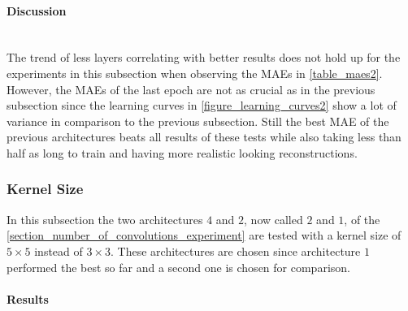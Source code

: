 \paragraph{Discussion} \mbox{} \\

The trend of less layers correlating with better results does not hold up for the experiments in this subsection when
observing the MAEs in \autoref{table_maes2}. However, the MAEs of the last epoch are not as crucial as in the 
previous subsection since the learning curves in \autoref{figure_learning_curves2} show a lot of variance in 
comparison to the previous subsection. Still the best MAE of the previous architectures beats all results of 
these tests while also taking less than half as long to train and having more realistic looking reconstructions.


\pagebreak
\subsubsection{Kernel Size}

In this subsection the two architectures $4$ and $2$, now called $2$ and $1$,
of the \autoref{section_number_of_convolutions_experiment}
are tested with a kernel size of $5\times 5$ instead of $3\times 3$. These architectures are chosen since architecture
$1$ performed the best so far and a second one is chosen for comparison. 

\paragraph{Results}

